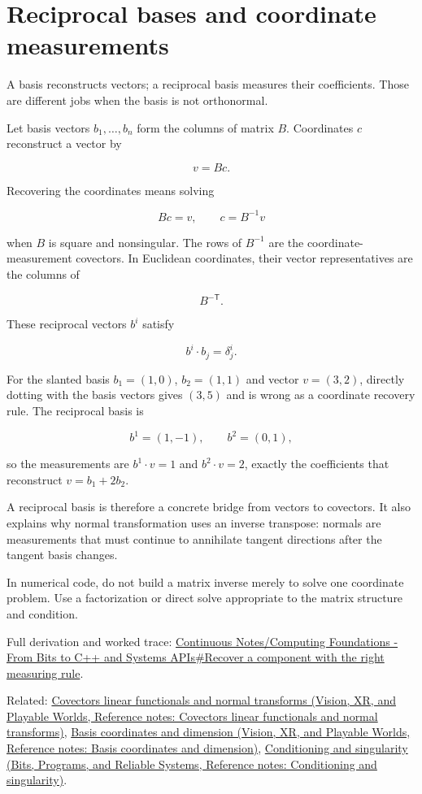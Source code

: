 \hypertarget{appendix-6b3d696dd902}{}\label{referencestart:appendix-6b3d696dd902}
\section{Reciprocal bases and coordinate measurements}\label{appendix-6b3d696dd902-reciprocal-bases-and-coordinate-measurements}

A basis reconstructs vectors; a reciprocal basis measures their coefficients. Those are different jobs when the basis is not orthonormal.

Let basis vectors \(b_1,\ldots,b_n\) form the columns of matrix \(B\). Coordinates \(c\) reconstruct a vector by

\[
v=Bc.
\]

Recovering the coordinates means solving

\[
Bc=v,
\qquad c=B^{-1}v
\]

when \(B\) is square and nonsingular. The rows of \(B^{-1}\) are the coordinate-measurement covectors. In Euclidean coordinates, their vector representatives are the columns of

\[
B^{-\mathsf T}.
\]

These reciprocal vectors \(b^i\) satisfy

\[
b^i\cdot b_j=\delta^i_j.
\]

For the slanted basis \(b_1=(1,0)\), \(b_2=(1,1)\) and vector \(v=(3,2)\), directly dotting with the basis vectors gives \((3,5)\) and is wrong as a coordinate recovery rule. The reciprocal basis is

\[
b^1=(1,-1),\qquad b^2=(0,1),
\]

so the measurements are \(b^1\cdot v=1\) and \(b^2\cdot v=2\), exactly the coefficients that reconstruct \(v=b_1+2b_2\).

A reciprocal basis is therefore a concrete bridge from vectors to covectors. It also explains why normal transformation uses an inverse transpose: normals are measurements that must continue to annihilate tangent directions after the tangent basis changes.

In numerical code, do not build a matrix inverse merely to solve one coordinate problem. Use a factorization or direct solve appropriate to the matrix structure and condition.

Full derivation and worked trace: \hyperref[01-foundations-i-ch017-recover-a-component-with-the-right-measuring-rule]{Continuous Notes/Computing Foundations - From Bits to C++ and Systems APIs\#Recover a component with the right measuring rule}.

Related: \href{../07-Vision-XR-and-Playable-Worlds/main.pdf\#nameddest=appendix-46da295c6787}{Covectors linear functionals and normal transforms (Vision, XR, and Playable Worlds, Reference notes: Covectors linear functionals and normal transforms)}, \href{../07-Vision-XR-and-Playable-Worlds/main.pdf\#nameddest=appendix-ce0341f7ea0d}{Basis coordinates and dimension (Vision, XR, and Playable Worlds, Reference notes: Basis coordinates and dimension)}, \href{../01-Bits-Programs-and-Reliable-Systems/main.pdf\#nameddest=appendix-8f6a01f284a7}{Conditioning and singularity (Bits, Programs, and Reliable Systems, Reference notes: Conditioning and singularity)}.
